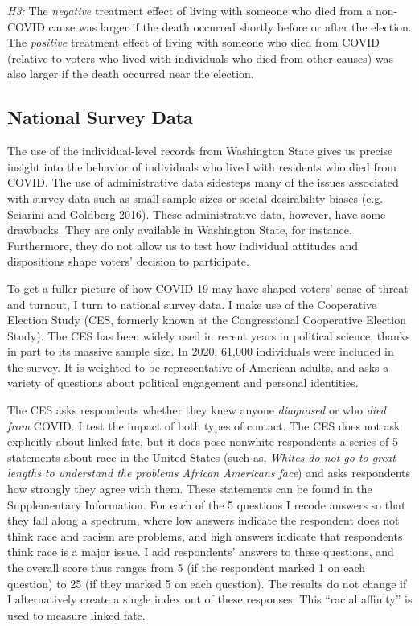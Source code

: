 \documentclass[
  12pt,
]{article}
\begin{document}
\emph{H3:} The \emph{negative} treatment effect of living with someone who died from a non-COVID cause was larger if the death occurred shortly before or after the election. The \emph{positive} treatment effect of living with someone who died from COVID (relative to voters who lived
with individuals who died from other causes) was also larger if the death occurred near the election.

\hypertarget{national-survey-data}{%
\subsection*{National Survey Data}\label{national-survey-data}}

The use of the individual-level records from Washington State gives us precise insight into the behavior of individuals who lived with residents who died from COVID. The use of administrative data sidesteps many of the issues associated with survey data such as small sample sizes or social desirability biases (e.g. \protect\hyperlink{ref-Sciarini2016}{Sciarini and Goldberg 2016}). These administrative data, however, have some drawbacks. They are only available in Washington State, for instance. Furthermore, they do not allow us to test how individual attitudes and dispositions shape voters' decision to participate.

To get a fuller picture of how COVID-19 may have shaped voters' sense of threat and turnout, I turn to national survey data. I make use of the Cooperative Election Study (CES, formerly known at the Congressional Cooperative Election Study). The CES has been widely used in recent years in political science, thanks in part to its massive sample size. In 2020, 61,000 individuals were included in the survey. It is weighted to be representative of American adults, and asks a variety of questions about political engagement and personal identities.

The CES asks respondents whether they knew anyone \emph{diagnosed} or who \emph{died from} COVID. I test the impact of both types of contact. The CES does not ask explicitly about linked fate, but it does pose nonwhite respondents a series of 5 statements about race in the United States (such as, \emph{Whites do not go to great lengths to understand the problems African Americans face}) and asks respondents how strongly they agree with them. These statements can be found in the Supplementary Information. For each of the 5 questions I recode answers so that they fall along a spectrum, where low answers indicate the respondent does not think race and racism are problems, and high answers indicate that respondents think race is a major issue. I add respondents' answers to these questions, and the overall score thus ranges from 5 (if the respondent marked 1 on each question) to 25 (if they marked 5 on each question). The results do not change if I alternatively create a single index out of these responses. This ``racial affinity'' is used to measure linked fate.
\end{document}
